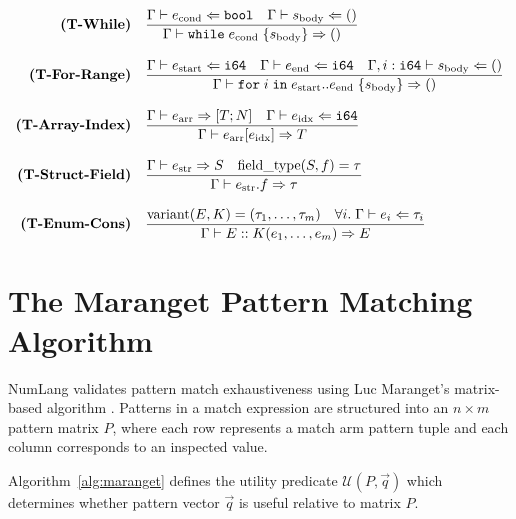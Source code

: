 \begin{align}
\text{\bf (T-While)} \quad & \frac{\Gamma \vdash e_{\text{cond}} \Leftarrow \mathtt{bool} \quad \Gamma \vdash s_{\text{body}} \Leftarrow \mathtt{()}}{\Gamma \vdash \mathtt{while}\; e_{\text{cond}}\; \{ s_{\text{body}} \} \Rightarrow \mathtt{()}} \\[0.8em]
\text{\bf (T-For-Range)} \quad & \frac{\Gamma \vdash e_{\text{start}} \Leftarrow \mathtt{i64} \quad \Gamma \vdash e_{\text{end}} \Leftarrow \mathtt{i64} \quad \Gamma, i : \mathtt{i64} \vdash s_{\text{body}} \Leftarrow \mathtt{()}}{\Gamma \vdash \mathtt{for}\; i \;\mathtt{in}\; e_{\text{start}}..e_{\text{end}}\; \{ s_{\text{body}} \} \Rightarrow \mathtt{()}} \\[0.8em]
\text{\bf (T-Array-Index)} \quad & \frac{\Gamma \vdash e_{\text{arr}} \Rightarrow [T; N] \quad \Gamma \vdash e_{\text{idx}} \Leftarrow \mathtt{i64}}{\Gamma \vdash e_{\text{arr}}[e_{\text{idx}}] \Rightarrow T} \\[0.8em]
\text{\bf (T-Struct-Field)} \quad & \frac{\Gamma \vdash e_{\text{str}} \Rightarrow S \quad \text{field\_type}(S, f) = \tau}{\Gamma \vdash e_{\text{str}}.f \Rightarrow \tau} \\[0.8em]
\text{\bf (T-Enum-Cons)} \quad & \frac{\text{variant}(E, K) = (\tau_1, \dots, \tau_m) \quad \forall i.\; \Gamma \vdash e_i \Leftarrow \tau_i}{\Gamma \vdash E::K(e_1, \dots, e_m) \Rightarrow E}
\end{align}

\section{The Maranget Pattern Matching Algorithm}
\label{sec:types:maranget}

NumLang validates pattern match exhaustiveness using Luc Maranget's matrix-based algorithm \citep{maranget2007warnings}. Patterns in a match expression are structured into an $n \times m$ pattern matrix $P$, where each row represents a match arm pattern tuple and each column corresponds to an inspected value.

Algorithm~\ref{alg:maranget} defines the utility predicate $\mathcal{U}(P, \vec{q})$ which determines whether pattern vector $\vec{q}$ is useful relative to matrix $P$.

